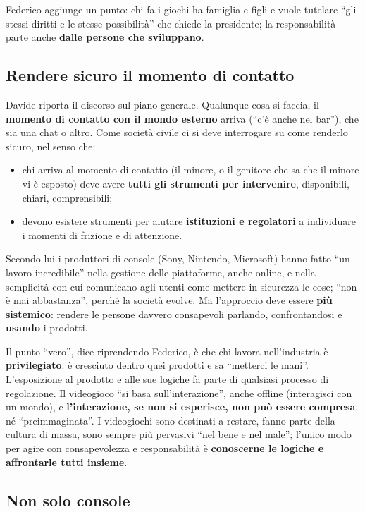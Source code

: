Federico aggiunge un punto: chi fa i giochi ha famiglia e figli e vuole
tutelare ``gli stessi diritti e le stesse possibilità'' che chiede la
presidente; la responsabilità parte anche \textbf{dalle persone che sviluppano}.

\subsection{Rendere sicuro il momento di contatto}

Davide riporta il discorso sul piano generale. Qualunque cosa si faccia, il
\textbf{momento di contatto con il mondo esterno} arriva (``c'è anche nel bar''),
che sia una chat o altro. Come società civile ci si deve interrogare su come
renderlo sicuro, nel senso che:
\begin{itemize}
  \item chi arriva al momento di contatto (il minore, o il genitore che sa che
        il minore vi è esposto) deve avere \textbf{tutti gli strumenti per
        intervenire}, disponibili, chiari, comprensibili;
  \item devono esistere strumenti per aiutare \textbf{istituzioni e
        regolatori} a individuare i momenti di frizione e di attenzione.
\end{itemize}
Secondo lui i produttori di console (Sony, Nintendo, Microsoft) hanno fatto ``un
lavoro incredibile'' nella gestione delle piattaforme, anche online, e nella
semplicità con cui comunicano agli utenti come mettere in sicurezza le cose;
``non è mai abbastanza'', perché la società evolve. Ma l'approccio deve essere
\textbf{più sistemico}: rendere le persone davvero consapevoli parlando,
confrontandosi e \textbf{usando} i prodotti.

Il punto ``vero'', dice riprendendo Federico, è che chi lavora nell'industria è
\textbf{privilegiato}: è cresciuto dentro quei prodotti e sa ``metterci le
mani''. L'esposizione al prodotto e alle sue logiche fa parte di qualsiasi
processo di regolazione. Il videogioco ``si basa sull'interazione'', anche
offline (interagisci con un mondo), e \textbf{l'interazione, se non si esperisce,
non può essere compresa}, né ``preimmaginata''. I videogiochi sono destinati a
restare, fanno parte della cultura di massa, sono sempre più pervasivi ``nel
bene e nel male''; l'unico modo per agire con consapevolezza e responsabilità è
\textbf{conoscerne le logiche e affrontarle tutti insieme}.

\subsection{Non solo console}

